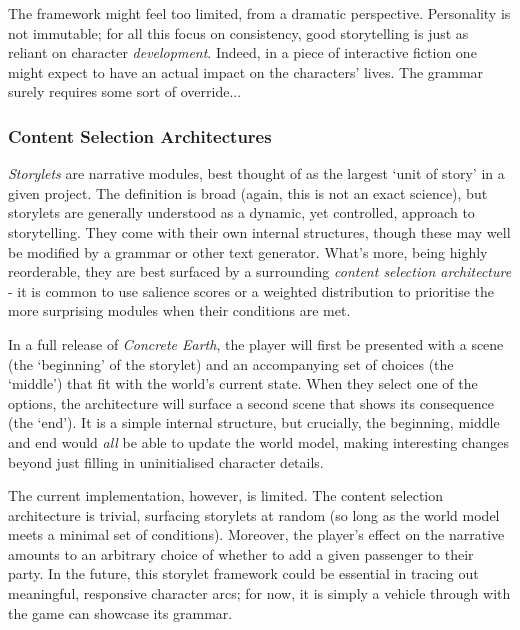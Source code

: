 \documentclass[a4paper, 11pt]{article}
\begin{document}
\begin{flushleft}
\vspace{5pt}\noindent
The framework might feel too limited, from a dramatic perspective. Personality is not immutable; for all this focus on consistency, good storytelling is just as reliant on character \textit{development}. Indeed, in a piece of interactive fiction one might expect to have an actual impact on the characters' lives. The grammar surely requires some sort of override...

\subsubsection{Content Selection Architectures} 

\textit{Storylets} \citep{kreminskiStorylets} are narrative modules, best thought of as the largest `unit of story' in a given project. The definition is broad (again, this is not an exact science), but storylets are generally understood as a dynamic, yet controlled, approach to storytelling. They come with their own internal structures, though these may well be modified by a grammar or other text generator. What's more, being highly reorderable, they are best surfaced by a surrounding \textit{content selection architecture} - it is common to use salience scores or a weighted distribution to prioritise the more surprising modules when their conditions are met.

\vspace{5pt}\noindent
In a full release of \textit{Concrete Earth}, the player will first be presented with a scene (the `beginning' of the storylet) and an accompanying set of choices (the `middle') that fit with the world's current state. When they select one of the options, the architecture will surface a second scene that shows its consequence (the `end'). It is a simple internal structure, but crucially, the beginning, middle and end would \textit{all} be able to update the world model, making interesting changes beyond just filling in uninitialised character details.
 
\newpage\noindent
The current implementation, however, is limited. The content selection architecture is trivial, surfacing storylets at random (so long as the world model meets a minimal set of conditions). Moreover, the player's effect on the narrative amounts to an arbitrary choice of whether to add a given passenger to their party. In the future, this storylet framework could be essential in tracing out meaningful, responsive character arcs; for now, it is simply a vehicle through with the game can showcase its grammar.


\end{flushleft}
\end{document}
